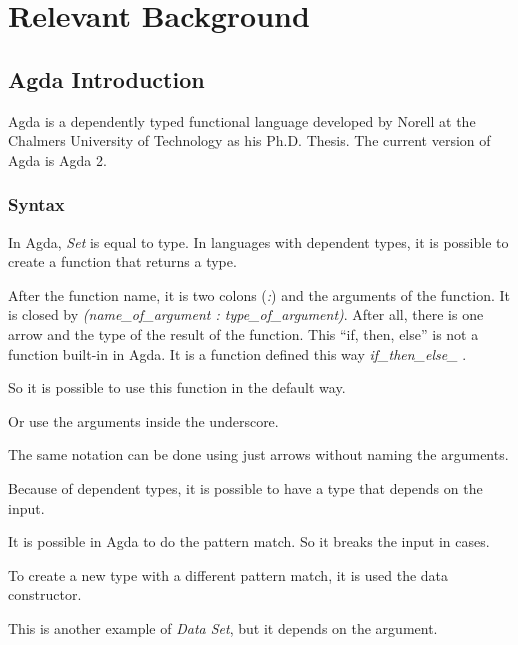 \section{Relevant Background}

\subsection{Agda Introduction}
Agda is a dependently typed functional language developed by Norell at the Chalmers University of Technology
as his Ph.D. Thesis.
The current version of Agda is Agda 2.

  \subsubsection{Syntax}
  In Agda, \emph{Set} is equal to type.
  In languages with dependent types, it is possible to create a function that returns a type.


  After the function name, it is two colons (\emph{:}) and the arguments of the function.
  It is closed by \emph{(name\_of\_argument : type\_of\_argument)}.
  After all, there is one arrow and the type of the result of the function.
  This ``if, then, else'' is not a function built-in in Agda.
  It is a function defined this way \emph{if\_then\_else\_} .

  So it is possible to use this function in the default way.


  Or use the arguments inside the underscore.


  The same notation can be done using just arrows without naming the arguments.

  Because of dependent types, it is possible to have a type that depends on the input.


  It is possible in Agda to do the pattern match.
  So it breaks the input in cases.


  To create a new type with a different pattern match, it is used the data constructor.


  This is another example of \emph{Data Set}, but it depends on the argument.

